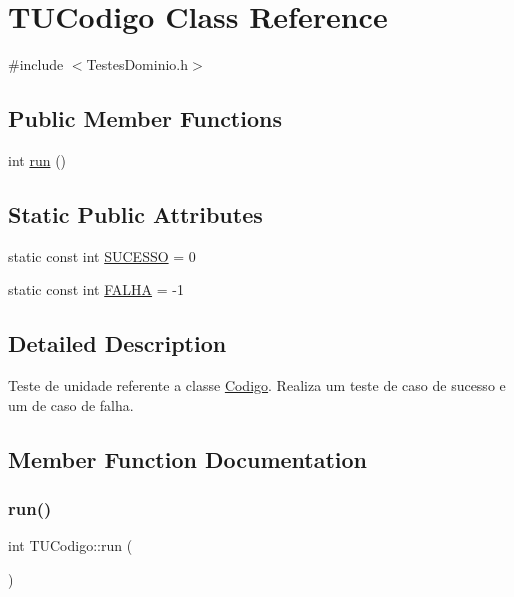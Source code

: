 \hypertarget{class_t_u_codigo}{}\section{T\+U\+Codigo Class Reference}
\label{class_t_u_codigo}


{\ttfamily \#include $<$Testes\+Dominio.\+h$>$}

\subsection*{Public Member Functions}
\begin{DoxyCompactItemize}
\item 
int \hyperlink{class_t_u_codigo_a4e6994bcde0011cdf0b0bb7a2c4d94d9}{run} ()
\end{DoxyCompactItemize}
\subsection*{Static Public Attributes}
\begin{DoxyCompactItemize}
\item 
static const int \hyperlink{class_t_u_codigo_ae74fd939ebced94047b47878406f53d1}{S\+U\+C\+E\+S\+SO} = 0
\item 
static const int \hyperlink{class_t_u_codigo_abff6dd7b04006df40462c76f8b769123}{F\+A\+L\+HA} = -\/1
\end{DoxyCompactItemize}


\subsection{Detailed Description}
Teste de unidade referente a classe \hyperlink{class_codigo}{Codigo}. Realiza um teste de caso de sucesso e um de caso de falha. 

\subsection{Member Function Documentation}
\mbox{\label{class_t_u_codigo_a4e6994bcde0011cdf0b0bb7a2c4d94d9}} 
\subsubsection{\texorpdfstring{run()}{run()}}
{\footnotesize\ttfamily int T\+U\+Codigo\+::run (\begin{DoxyParamCaption}{ }\end{DoxyParamCaption})}



